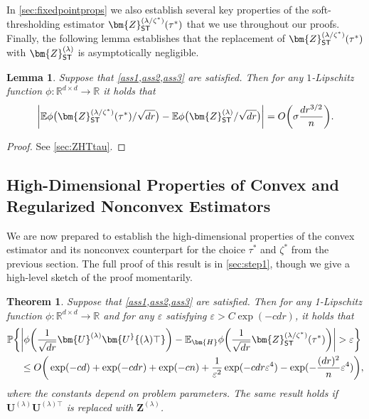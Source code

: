 \documentclass[10pt]{article}
\newcommand{\eps}{\ensuremath{\varepsilon}}
\newcommand{\s}{^*}
\newcommand{\p}{\mathbb{P}}
\newtheorem{theorem}{Theorem}
\newtheorem{lemma}{Lemma}
\theoremstyle{definition}
\begin{document}
 In  \cref{sec:fixedpointprops} we also establish several key properties of the soft-thresholding estimator $\bm{Z}_{{\sf ST}}^{(\lambda/\zeta\s)}(\tau\s)$ that we use throughout our proofs.  Finally, the following lemma establishes that the replacement of $\bm{Z}_{{\sf ST}}^{(\lambda/\zeta\s)}(\tau\s)$ with $\bm{Z}_{{\sf ST}}^{(\lambda)}$ is asymptotically negligible.
 
\begin{lemma}\label{lem:ZSTtau} Suppose that \cref{ass1,ass2,ass3} are satisfied. Then for any $1$-Lipschitz function $\phi: \mathbb{R}^{d\times d} \to \mathbb{R}$ it holds that
    \begin{align}
         \bigg| \mathbb{E} \phi \big( \bm{Z}_{{\sf ST}}^{(\lambda/\zeta\s)}(\tau\s)/\sqrt{dr} \big) - \mathbb{E} \phi \big( \bm{Z}_{{\sf ST}}^{(\lambda)}/\sqrt{dr} \big) \bigg| = O\bigg( \sigma \frac{d r^{3/2}}{n}\bigg).
    \end{align}
\end{lemma}

\begin{proof}
    See \cref{sec:ZHTtau}.  
\end{proof}



\subsection{High-Dimensional Properties of Convex and Regularized Nonconvex Estimators} \label{sec:cvxasymptotics}
We are now prepared to establish the high-dimensional properties of the convex estimator and its nonconvex counterpart for the choice $\tau\s$ and $\zeta\s$ from the previous section.  The full proof of this result is in \cref{sec:step1}, though we give a high-level sketch of the proof momentarily.  
\begin{theorem} 
 \label{thm:cvxasymptotics}
Suppose that \cref{ass1,ass2,ass3} are satisfied. Then for any 1-Lipschitz function $\phi: \mathbb{R}^{d \times d} \to \mathbb{R}$ and for any $\eps$ satisfying $\eps > C \exp( - c d r)$, it holds that
\begin{align}
   \p\bigg\{ &\bigg| \phi\bigg( \frac{1}{\sqrt{dr}} \bm{U}^{(\lambda) } \bm{U^}{(\lambda)\top} \bigg) - \mathbb{E}_{\bm{H}} \phi\bigg( \frac{1}{\sqrt{dr}} \bm{Z}^{(\lambda/\zeta\s)}_{{\sf ST}}(\tau\s) \bigg) \bigg| > \eps \bigg\}\\
   &\leq  O\bigg( \exp( - c d) +  \exp( - c dr) + \exp( - c n) + \frac{1}{\eps^2} \exp(-c dr \eps^4 ) - \exp( - \frac{(dr)^2}{n} \eps^4) \bigg),
\end{align}
where the constants depend on problem parameters.  The same result holds if $\bm{U}^{(\lambda)} \bm{U}^{(\lambda)\top}$ is replaced with $\bm{Z}^{(\lambda)}$.
\end{theorem}
\end{document}
